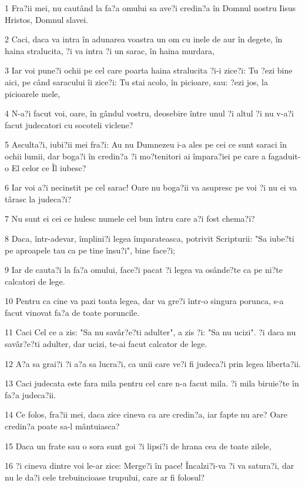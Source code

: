 \par 1 Fra?ii mei, nu cautând la fa?a omului sa ave?i credin?a în Domnul nostru Iisus Hristos, Domnul slavei.
\par 2 Caci, daca va intra în adunarea voastra un om cu inele de aur în degete, în haina stralucita, ?i va intra ?i un sarac, în haina murdara,
\par 3 Iar voi pune?i ochii pe cel care poarta haina stralucita ?i-i zice?i: Tu ?ezi bine aici, pe când saracului îi zice?i: Tu stai acolo, în picioare, sau: ?ezi jos, la picioarele mele,
\par 4 N-a?i facut voi, oare, în gândul vostru, deosebire între unul ?i altul ?i nu v-a?i facut judecatori cu socoteli viclene?
\par 5 Asculta?i, iubi?ii mei fra?i: Au nu Dumnezeu i-a ales pe cei ce sunt saraci în ochii lumii, dar boga?i în credin?a ?i mo?tenitori ai împara?iei pe care a fagaduit-o El celor ce Îl iubesc?
\par 6 Iar voi a?i necinstit pe cel sarac! Oare nu boga?ii va asupresc pe voi ?i nu ei va târasc la judeca?i?
\par 7 Nu sunt ei cei ce hulesc numele cel bun întru care a?i fost chema?i?
\par 8 Daca, într-adevar, împlini?i legea împarateasca, potrivit Scripturii: "Sa iube?ti pe aproapele tau ca pe tine însu?i", bine face?i;
\par 9 Iar de cauta?i la fa?a omului, face?i pacat ?i legea va osânde?te ca pe ni?te calcatori de lege.
\par 10 Pentru ca cine va pazi toata legea, dar va gre?i într-o singura porunca, s-a facut vinovat fa?a de toate poruncile.
\par 11 Caci Cel ce a zis: "Sa nu savâr?e?ti adulter", a zis ?i: "Sa nu ucizi". ?i daca nu savâr?e?ti adulter, dar ucizi, te-ai facut calcator de lege.
\par 12 A?a sa grai?i ?i a?a sa lucra?i, ca unii care ve?i fi judeca?i prin legea liberta?ii.
\par 13 Caci judecata este fara mila pentru cel care n-a facut mila. ?i mila biruie?te în fa?a judeca?ii.
\par 14 Ce folos, fra?ii mei, daca zice cineva ca are credin?a, iar fapte nu are? Oare credin?a poate sa-l mântuiasca?
\par 15 Daca un frate sau o sora sunt goi ?i lipsi?i de hrana cea de toate zilele,
\par 16 ?i cineva dintre voi le-ar zice: Merge?i în pace! Încalzi?i-va ?i va satura?i, dar nu le da?i cele trebuincioase trupului, care ar fi folosul?
